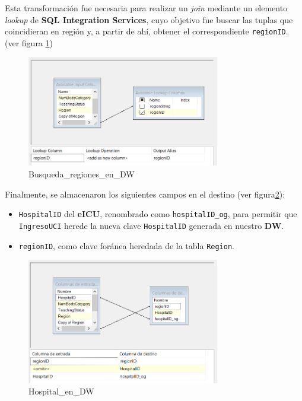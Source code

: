 \documentclass[12pt, a4paper, twoside]{article}
\begin{document}
	Esta transformación fue necesaria para realizar un \textit{join} mediante un elemento \textit{lookup} de \textbf{SQL Integration Services}, cuyo objetivo fue buscar las tuplas que coincidieran en región y, a partir de ahí, obtener el correspondiente \texttt{regionID}. (ver figura \ref{fig:22})
	
	\begin{figure}[H]
		\centering
		\includegraphics[width=0.75\textwidth]{image/105_cargahospital_lookup.png}
		\caption{Busqueda\_regiones\_en\_DW}
		\label{fig:22}
	\end{figure}

	
	Finalmente, se almacenaron los siguientes campos en el destino (ver figura\ref{fig:23}):
	
	\begin{itemize}
		\item \texttt{HospitalID} del \textbf{eICU}, renombrado como \texttt{hospitalID\_og}, para permitir que \texttt{IngresoUCI} herede la nueva clave \texttt{HospitalID} generada en nuestro \textbf{DW}.
		\item \texttt{regionID}, como clave foránea heredada de la tabla \texttt{Region}.
	\end{itemize}
	
	\begin{figure}[H]
		\centering
		\includegraphics[width=0.75\textwidth]{image/105_cargahospital_destino.png}
		\caption{Hospital\_en\_DW}
		\label{fig:23}
	\end{figure}
\end{document}
